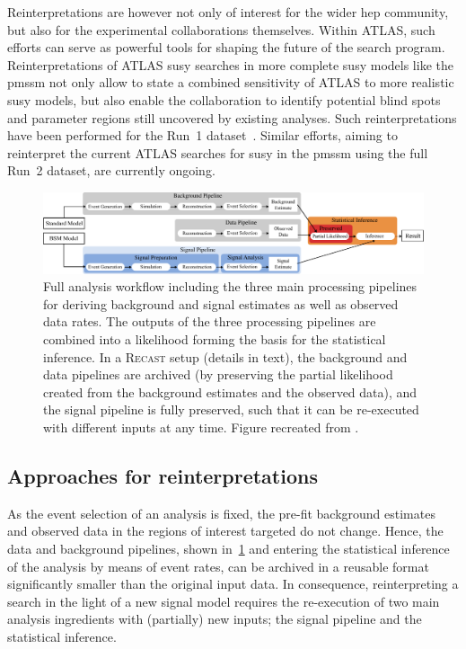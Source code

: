 Reinterpretations are however not only of interest for the wider \gls{hep} community, but also for the experimental collaborations themselves. Within ATLAS, such efforts can serve as powerful tools for shaping the future of the search program. Reinterpretations of ATLAS \gls{susy} searches in more complete \gls{susy} models like the \gls{pmssm} not only allow to state a combined sensitivity of ATLAS to more realistic \gls{susy} models, but also enable the collaboration to identify potential blind spots and parameter regions still uncovered by existing analyses. Such reinterpretations have been performed for the Run~1 dataset~\cite{pMSSM-scan-run1:2015baa,Aaboud:2016wna}. Similar efforts, aiming to reinterpret the current ATLAS searches for \gls{susy} in the \gls{pmssm} using the full Run~2 dataset, are currently ongoing. 

 \begin{figure}
	\centering\includegraphics[width=\textwidth]{pipeline}
	\caption{Full analysis workflow including the three main processing pipelines for deriving background and signal estimates as well as observed data rates. The outputs of the three processing pipelines are combined into a likelihood forming the basis for the statistical inference. In a \textsc{Recast} setup (details in text), the background and data pipelines are archived (\eg by preserving the partial likelihood created from the background estimates and the observed data), and the signal pipeline is fully preserved, such that it can be re-executed with different inputs at any time. Figure recreated from \cite{ATL-PHYS-PUB-2019-032}.}
	\label{fig:pipeline_analysis}
\end{figure}

\subsection{Approaches for reinterpretations}

As the event selection of an analysis is fixed, the pre-fit background estimates and observed data in the regions of interest targeted do not change. Hence, the data and background pipelines, shown in~\cref{fig:pipeline_analysis} and entering the statistical inference of the analysis by means of event rates, can be archived in a reusable format significantly smaller than the original input data.
In consequence, reinterpreting a search in the light of a new signal model requires the re-execution of two main analysis ingredients with (partially) new inputs; the signal pipeline and the statistical inference.

